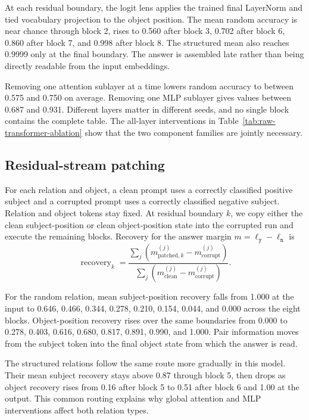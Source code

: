 \documentclass[11pt]{article}
\begin{document}
At each residual boundary, the logit lens applies the trained final LayerNorm
and tied vocabulary projection to the object position.  The mean random
accuracy is near chance through block 2, rises to 0.560 after block 3, 0.702
after block 6, 0.860 after block 7, and 0.998 after block 8.  The structured
mean also reaches 0.9999 only at the final boundary.  The answer is assembled
late rather than being directly readable from the input embeddings.

Removing one attention sublayer at a time lowers random accuracy to between
0.575 and 0.750 on average.  Removing one MLP sublayer gives values between
0.687 and 0.931.  Different layers matter in different seeds, and no single
block contains the complete table.  The all-layer interventions in
Table~\ref{tab:raw-transformer-ablation} show that the two component families
are jointly necessary.

\subsection{Residual-stream patching}

For each relation and object, a clean prompt uses a correctly classified
positive subject and a corrupted prompt uses a correctly classified negative
subject.  Relation and object tokens stay fixed.  At residual boundary $k$, we
copy either the clean subject-position or clean object-position state into the
corrupted run and execute the remaining blocks.  Recovery for the answer margin
$m=\ell_{\texttt{y}}-\ell_{\texttt{n}}$ is
\[
  \operatorname{recovery}_k=
  \frac{\sum_j(m^{(j)}_{\mathrm{patched},k}-m^{(j)}_{\mathrm{corrupt}})}
       {\sum_j(m^{(j)}_{\mathrm{clean}}-m^{(j)}_{\mathrm{corrupt}})}.
\]

For the random relation, mean subject-position recovery falls from 1.000 at the
input to 0.646, 0.466, 0.344, 0.278, 0.210, 0.154, 0.044, and 0.000 across the
eight blocks.  Object-position recovery rises over the same boundaries from
0.000 to 0.278, 0.403, 0.616, 0.680, 0.817, 0.891, 0.990, and 1.000.  Pair
information moves from the subject token into the final object state from
which the answer is read.

The structured relations follow the same route more gradually in this model.
Their mean subject recovery stays above 0.87 through block 5, then drops as
object recovery rises from 0.16 after block 5 to 0.51 after block 6 and 1.00 at
the output.  This common routing explains why global attention and MLP
interventions affect both relation types.
\end{document}
